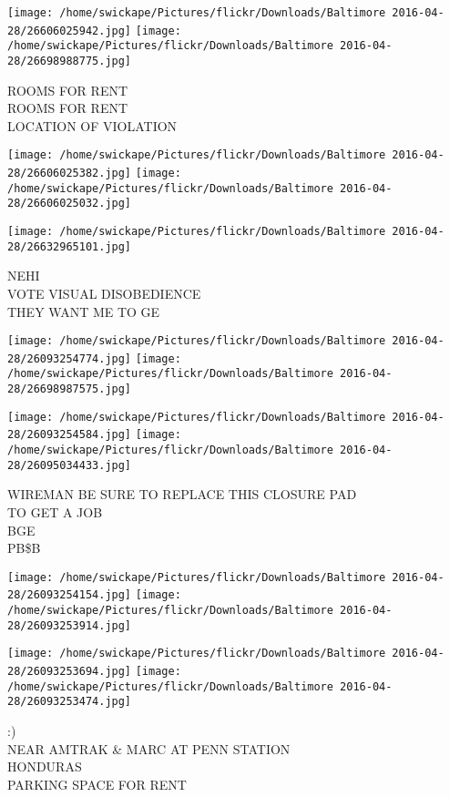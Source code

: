 \documentclass[10pt,letterpaper]{article}
\begin{document}
\vspace{0.25in}
\texttt{[image: /home/swickape/Pictures/flickr/Downloads/Baltimore 2016-04-28/26606025942.jpg]}
\texttt{[image: /home/swickape/Pictures/flickr/Downloads/Baltimore 2016-04-28/26698988775.jpg]}

ROOMS FOR RENT\\
ROOMS FOR RENT\\
LOCATION OF VIOLATION\\
\pagebreak

\texttt{[image: /home/swickape/Pictures/flickr/Downloads/Baltimore 2016-04-28/26606025382.jpg]}
\texttt{[image: /home/swickape/Pictures/flickr/Downloads/Baltimore 2016-04-28/26606025032.jpg]}

\vspace{0.25in}
\texttt{[image: /home/swickape/Pictures/flickr/Downloads/Baltimore 2016-04-28/26632965101.jpg]}

NEHI\\
VOTE VISUAL DISOBEDIENCE\\
THEY WANT ME TO GE\\
\pagebreak

\texttt{[image: /home/swickape/Pictures/flickr/Downloads/Baltimore 2016-04-28/26093254774.jpg]}
\texttt{[image: /home/swickape/Pictures/flickr/Downloads/Baltimore 2016-04-28/26698987575.jpg]}

\texttt{[image: /home/swickape/Pictures/flickr/Downloads/Baltimore 2016-04-28/26093254584.jpg]}
\texttt{[image: /home/swickape/Pictures/flickr/Downloads/Baltimore 2016-04-28/26095034433.jpg]}

WIREMAN BE SURE TO REPLACE THIS CLOSURE PAD\\
TO GET A JOB\\
BGE\\
PB\$B\\
\pagebreak

\texttt{[image: /home/swickape/Pictures/flickr/Downloads/Baltimore 2016-04-28/26093254154.jpg]}
\texttt{[image: /home/swickape/Pictures/flickr/Downloads/Baltimore 2016-04-28/26093253914.jpg]}

\texttt{[image: /home/swickape/Pictures/flickr/Downloads/Baltimore 2016-04-28/26093253694.jpg]}
\texttt{[image: /home/swickape/Pictures/flickr/Downloads/Baltimore 2016-04-28/26093253474.jpg]}

:)\\
NEAR AMTRAK \& MARC AT PENN STATION\\
HONDURAS\\
PARKING SPACE FOR RENT\\
\pagebreak
\end{document}
